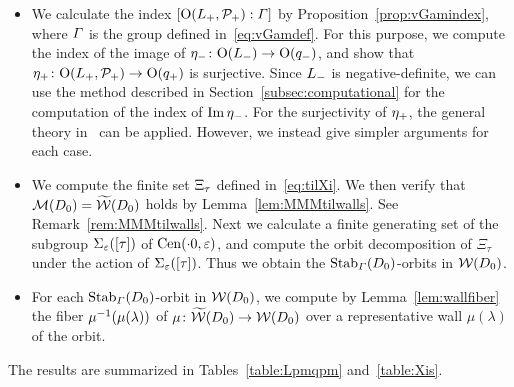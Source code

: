 \documentclass{amsart} %
\begin{document}
\begin{itemize}
\item 
We calculate the index $[\mathord{\mathrm{O}}(L_{+}, \mathord{\mathcal{P}}_{+}): \varGamma]$ 
by Proposition~\ref{prop:vGamindex},
where $\varGamma$ is the group defined in~\eqref{eq:vGamdef}.
 For this purpose, 
we compute the index of 
the image of ${\eta}_{-}\colon \mathord{\mathrm{O}}(L_{-})\to \mathord{\mathrm{O}}(q_{-})$, and 
show that 
${\eta}_{+}\colon \mathord{\mathrm{O}}(L_{+}, \mathord{\mathcal{P}}_{+})\to \mathord{\mathrm{O}}(q_{+})$
is surjective.
Since $L_{-}$ is negative-definite,
we can use the method described in Section~\ref{subsec:computational}
for the computation of the index of  $\operatorname{Im} {\eta}_{-}$.
For the surjectivity of ${\eta}_{+}$, 
the general theory in~\cite[Chapter VIII]{MirandaMorrison2009} can be applied.
However,  we instead give simpler arguments for each case.
\item 
We compute the finite set $\Xi_{\tau}$
defined in~\eqref{eq:tilXi}.
%
%
We then verify that $\mathord{\mathcal{M}}(D_0)=\widetilde{\mathord{\mathcal{W}}} (D_0)$ holds
by Lemma~\ref{lem:MMMtilwalls}.
See Remark~\ref{rem:MMMtilwalls}.
Next we 
calculate a finite generating set of 
the subgroup $\Sigma_{\varepsilon}([\tau])$ of $\mathrm{Cen}(\cdot 0, \varepsilon)$,
and 
compute the orbit decomposition of $\Xi_{\tau}$ under the action of $\Sigma_{\varepsilon}([\tau])$.
Thus we obtain 
the $\operatorname{Stab}_{\varGamma}(D_0)$-orbits in $\mathord{\mathcal{W}}(D_0)$.
\item
For each $\operatorname{Stab}_{\varGamma}(D_0)$-orbit in $\mathord{\mathcal{W}}(D_0)$,
we compute by Lemma~\ref{lem:wallfiber} the fiber $\mu^{-1}(\mu(\lambda))$ of $\mu\colon \widetilde{\mathord{\mathcal{W}}}(D_0)\to \mathord{\mathcal{W}}(D_0)$
over a representative wall $\mu(\lambda)$ of the orbit.
\end{itemize}
%
The results are summarized in Tables~\ref{table:Lpmqpm} and~\ref{table:Xis}.
%
\end{document}
